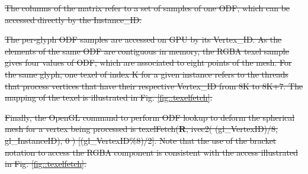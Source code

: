 \documentclass[twoside,twocolumn,10pt]{article}
\begin{document}
\sout{The columns of the matrix refer to a set of samples of one ODF, which can be accessed directly by the Instance\_ID.}

\sout{The per-glyph ODF samples are accessed on GPU by its Vertex\_ID. As the elements of the same ODF are contiguous in memory, the RGBA texel sample gives four values of ODF, which are associated to eight points of the mesh. For the same glyph, one texel of index K for a given instance refers to the threads that process vertices that have their respective Vertex\_ID from 8K to 8K+7. The mapping of the texel is illustrated in Fig. \ref{fig::texelfetch}.}

\sout{Finally, the OpenGL command to perform ODF lookup to deform the spherical mesh for a vertex being processed is texelFetch(\textbf{R}, ivec2( (gl\_VertexID)/8, gl\_InstanceID), 0 ) [(gl\_VertexID\%8)/2]. Note that the use of the bracket notation to access the RGBA component is consistent with the access illustrated in Fig. \ref{fig::texelfetch}.}








\end{document}
